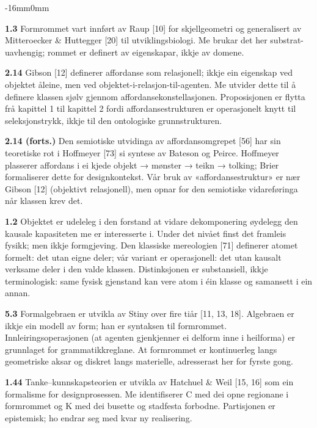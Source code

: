 \documentclass[10pt,oneside]{book}
\newenvironment{widebody}{%
  \begin{adjustwidth}{-16mm}{0mm}%
}{%
  \end{adjustwidth}%
}
\begin{document}
\par\addvspace{14pt}
\begin{widebody}
{\footnotesize

\textbf{1.3} Formrommet vart innført av Raup [10] for skjellgeometri og generalisert av Mitteroecker \& Huttegger [20] til utviklingsbiologi. Me brukar det her substrat-uavhengig; rommet er definert av eigenskapar, ikkje av domene.

\textbf{2.14} Gibson [12] definerer affordanse som relasjonell; ikkje ein eigenskap ved objektet åleine, men ved objektet-i-relasjon-til-agenten. Me utvider dette til å definere klassen sjølv gjennom affordansekonstellasjonen. Proposisjonen er flytta frå kapittel 1 til kapittel 2 fordi affordansestrukturen er operasjonelt knytt til seleksjonstrykk, ikkje til den ontologiske grunnstrukturen.

\textbf{2.14 (forts.)} Den semiotiske utvidinga av affordansomgrepet [56] har sin teoretiske rot i Hoffmeyer [73] si syntese av Bateson og Peirce. Hoffmeyer plasserer affordans i ei kjede objekt → mønster → teikn → tolking; Brier formaliserer dette for designkontekst. Vår bruk av «affordansestruktur» er nær Gibson [12] (objektivt relasjonell), men opnar for den semiotiske vidareføringa når klassen krev det.

\textbf{1.2} Objektet er udeleleg i den forstand at vidare dekomponering øydelegg den kausale kapasiteten me er interesserte i. Under det nivået finst det framleis fysikk; men ikkje formgjeving. Den klassiske mereologien [71] definerer atomet formelt: det utan eigne deler; vår variant er operasjonell: det utan kausalt verksame deler i den valde klassen. Distinksjonen er substansiell, ikkje terminologisk: same fysisk gjenstand kan vere atom i éin klasse og samansett i ein annan.

\textbf{5.3} Formalgebraen er utvikla av Stiny over fire tiår [11, 13, 18]. Algebraen er ikkje ein modell av form; han er syntaksen til formrommet. Innleiringsoperasjonen (at agenten gjenkjenner ei delform inne i heilforma) er grunnlaget for grammatikkreglane. At formrommet er kontinuerleg langs geometriske aksar og diskret langs materielle, adresserast her for fyrste gong.

\textbf{1.44} Tanke--kunnskapsteorien er utvikla av Hatchuel \& Weil [15, 16] som ein formalisme for designprosessen. Me identifiserer C med dei opne regionane i formrommet og K med dei busette og stadfesta forbodne. Partisjonen er epistemisk; ho endrar seg med kvar ny realisering.

}
\end{widebody}
\end{document}
